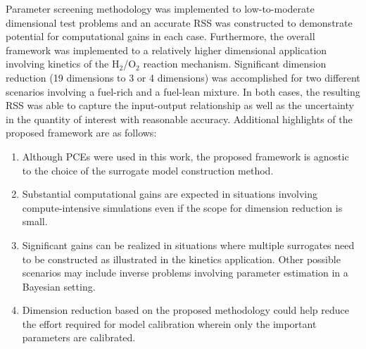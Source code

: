 Parameter screening methodology was implemented to low-to-moderate dimensional
test problems and an accurate RSS was constructed to demonstrate potential for
computational gains in each case. Furthermore, the overall framework was
implemented  to a relatively higher dimensional application involving kinetics
of the H$_2$/O$_2$ reaction mechanism.  Significant dimension reduction (19 
dimensions to 3 or 4 dimensions) was
accomplished for two different scenarios involving a fuel-rich and a fuel-lean
mixture. In both cases, the resulting RSS was able to capture the input-output
relationship as well as the uncertainty in the quantity of interest with
reasonable accuracy. 
Additional highlights of the proposed framework are as follows:
\begin{enumerate}
\item Although PCEs were used in this work, the proposed framework is
agnostic to the choice of the surrogate model construction method.
\item Substantial computational gains are expected in situations involving
compute-intensive simulations even if the scope for dimension reduction is
small. 

\item Significant gains can be realized in situations where multiple surrogates need to be
constructed as illustrated in the kinetics application. Other possible scenarios may
include inverse problems involving parameter estimation in a Bayesian setting.

\item Dimension reduction based on the proposed methodology could help reduce the
effort required for model calibration wherein only the important parameters
are calibrated. 
\end{enumerate}

